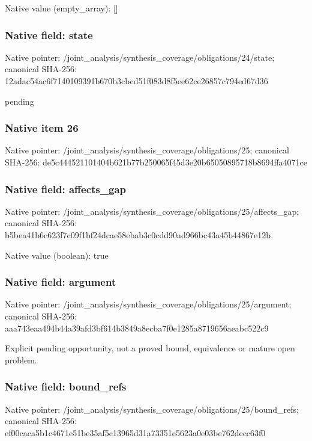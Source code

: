 \documentclass[10pt,a4paper]{article}
\begin{document}
Native value (empty\_\allowbreak{}array): []

\subsubsection{Native field: state}
Native pointer: /joint\_\allowbreak{}analysis/synthesis\_\allowbreak{}coverage/obligations/24/state; canonical SHA-256: 12adac54ac6f7140109391b670b3cbcd51f083d8f5ee62ce26857c794ed67d36

\begingroup\raggedright\sloppy pending\par\endgroup

\subsubsection{Native item 26}
Native pointer: /joint\_\allowbreak{}analysis/synthesis\_\allowbreak{}coverage/obligations/25; canonical SHA-256: de5c444521101404b621b77b250065f45d3e20b65050895718b8694ffa4071ce

\subsubsection{Native field: affects\_\allowbreak{}gap}
Native pointer: /joint\_\allowbreak{}analysis/synthesis\_\allowbreak{}coverage/obligations/25/affects\_\allowbreak{}gap; canonical SHA-256: b5bea41b6c623f7c09f1bf24dcae58ebab3c0cdd90ad966bc43a45b44867e12b

Native value (boolean): true

\subsubsection{Native field: argument}
Native pointer: /joint\_\allowbreak{}analysis/synthesis\_\allowbreak{}coverage/obligations/25/argument; canonical SHA-256: aaa743eaa494b44a39afd3bf614b3849a8ecba7f0e1285a8719656aeabc522c9

\begingroup\raggedright\sloppy Explicit pending opportunity,\allowbreak{} not a proved bound,\allowbreak{} equivalence or mature open problem.\par\endgroup

\subsubsection{Native field: bound\_\allowbreak{}refs}
Native pointer: /joint\_\allowbreak{}analysis/synthesis\_\allowbreak{}coverage/obligations/25/bound\_\allowbreak{}refs; canonical SHA-256: ef00caca5b1c4671e51be35af5c13965d31a73351e5623a0e03be762decc63f0
\end{document}
